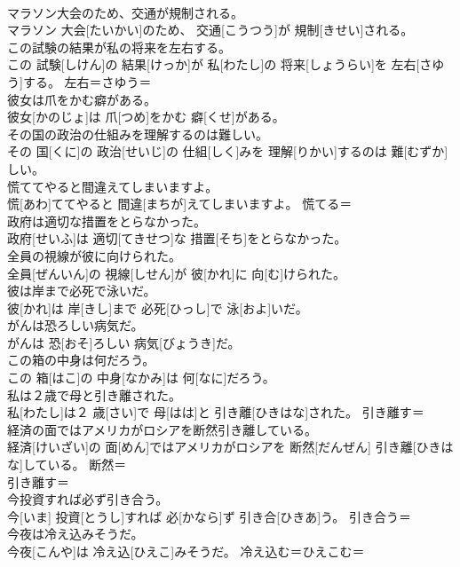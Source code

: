 \documentclass[8pt]{extreport}
\begin{document}
\begin{CJK}{UTF8}{min}
\\	マラソン大会のため、交通が規制される。	
\\	マラソン 大会[たいかい]のため、 交通[こうつう]が 規制[きせい]される。	
\\	この試験の結果が私の将来を左右する。	
\\	この 試験[しけん]の 結果[けっか]が 私[わたし]の 将来[しょうらい]を 左右[さゆう]する。	左右＝さゆう＝ 
\\	彼女は爪をかむ癖がある。	
\\	彼女[かのじょ]は 爪[つめ]をかむ 癖[くせ]がある。	
\\	その国の政治の仕組みを理解するのは難しい。	
\\	その 国[くに]の 政治[せいじ]の 仕組[しく]みを 理解[りかい]するのは 難[むずか]しい。	
\\	慌ててやると間違えてしまいますよ。	
\\	慌[あわ]ててやると 間違[まちが]えてしまいますよ。	慌てる＝ 
\\	政府は適切な措置をとらなかった。	
\\	政府[せいふ]は 適切[てきせつ]な 措置[そち]をとらなかった。	
\\	全員の視線が彼に向けられた。	
\\	全員[ぜんいん]の 視線[しせん]が 彼[かれ]に 向[む]けられた。	
\\	彼は岸まで必死で泳いだ。	
\\	彼[かれ]は 岸[きし]まで 必死[ひっし]で 泳[およ]いだ。	
\\	がんは恐ろしい病気だ。	
\\	がんは 恐[おそ]ろしい 病気[びょうき]だ。	
\\	この箱の中身は何だろう。	
\\	この 箱[はこ]の 中身[なかみ]は 何[なに]だろう。	
\\	私は２歳で母と引き離された。	
\\	私[わたし]は２ 歳[さい]で 母[はは]と 引き離[ひきはな]された。	引き離す＝ 
\\	経済の面ではアメリカがロシアを断然引き離している。	
\\	経済[けいざい]の 面[めん]ではアメリカがロシアを 断然[だんぜん] 引き離[ひきはな]している。	断然＝ 
\\	引き離す＝ 
\\	今投資すれば必ず引き合う。	
\\	今[いま] 投資[とうし]すれば 必[かなら]ず 引き合[ひきあ]う。	引き合う＝ 
\\	今夜は冷え込みそうだ。	
\\	今夜[こんや]は 冷え込[ひえこ]みそうだ。	冷え込む＝ひえこむ＝ 

\end{CJK}
\end{document}
